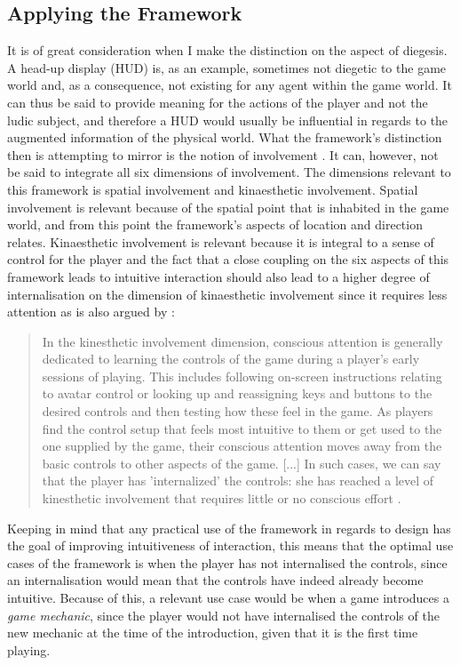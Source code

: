 \subsection{Applying the Framework}
It is of great consideration when I make the distinction on the aspect of diegesis. A head-up display (HUD) is, as an example, sometimes not diegetic to the game world and, as a consequence, not existing for any agent within the game world. It can thus be said to provide meaning for the actions of the player and not the ludic subject, and therefore a HUD would usually be influential in regards to the augmented information of the physical world. What the framework's distinction then is attempting to mirror is the notion of involvement . It can, however, not be said to integrate all six dimensions of involvement. The dimensions relevant to this framework is spatial involvement and kinaesthetic involvement. Spatial involvement is relevant because of the spatial point that is inhabited in the game world, and from this point the framework's aspects of location and direction relates. Kinaesthetic involvement is relevant because it is integral to a sense of control for the player and the fact that a close coupling on the six aspects of this framework leads to intuitive interaction \cite{frogger} should also lead to a higher degree of internalisation on the dimension of kinaesthetic involvement since it requires less attention as is also argued by \cite{calleja}:
\begin{quote}
  In the kinesthetic involvement dimension, conscious attention is generally dedicated to learning the controls of the game during a player’s early sessions of playing. This includes following on-screen instructions relating to avatar control or looking up and reassigning keys and buttons to the desired controls and then testing how these feel in the game. As players find the control setup that feels most intuitive to them or get used to the one supplied by the game, their conscious attention moves away from the basic controls to other aspects of the game. [...] In such cases, we can say that the player has 'internalized' the controls: she has reached a level of kinesthetic involvement that requires little or no conscious effort \cite[p. 45]{calleja}.
\end{quote}
Keeping in mind that any practical use of the framework in regards to design has the goal of improving intuitiveness of interaction, this means that the optimal use cases of the framework is when the player has not internalised the controls, since an internalisation would mean that the controls have indeed already become intuitive. Because of this, a relevant use case would be when a game introduces a \textit{game mechanic}, since the player would not have internalised the controls of the new mechanic at the time of the introduction, given that it is the first time playing.

